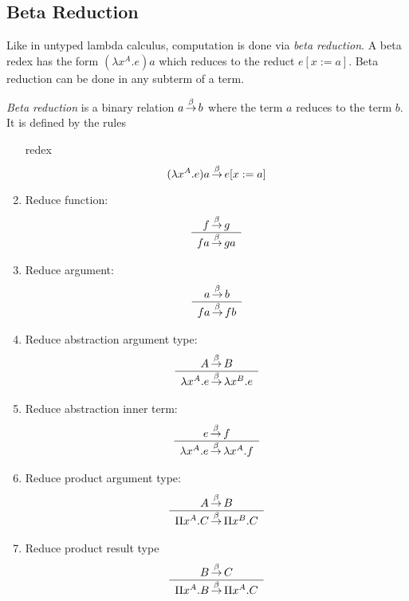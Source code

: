 \subsection{Beta Reduction}

Like in untyped lambda calculus, computation is done via \emph{beta reduction}.
A beta redex has the form $(\lambda x^A. e) a$ which reduces to the reduct
$e[x:=a]$. Beta reduction can be done in any subterm of a term.

\begin{definition}
    \emph{Beta reduction}
    is a binary relation $a {\,\stackrel{\beta}{\to}\,} b$ where the term $a$
    reduces to the term $b$. It is defined by the rules
    \begin{enumerate}

        \item[redex]
            $$
                (\lambda x^A. e) a {\,\stackrel{\beta}{\to}\,} e[x:=a]
            $$

        \item Reduce function:
            $$
                \begin{array}{c} 
                    f {\,\stackrel{\beta}{\to}\,} g
                 \\ \hline 
                    f a {\,\stackrel{\beta}{\to}\,} g a
                \end{array}
            $$

        \item Reduce argument:
            $$
                \begin{array}{c} 
                    a {\,\stackrel{\beta}{\to}\,} b
                 \\ \hline 
                    f a {\,\stackrel{\beta}{\to}\,} f b
                \end{array}
            $$

        \item Reduce abstraction argument type:
            $$
                \begin{array}{c} 
                    A {\,\stackrel{\beta}{\to}\,} B
                 \\ \hline 
                    \lambda x^A. e {\,\stackrel{\beta}{\to}\,} \lambda x^B . e
                \end{array}
            $$

        \item Reduce abstraction inner term:
            $$
                \begin{array}{c} 
                    e {\,\stackrel{\beta}{\to}\,} f
                 \\ \hline 
                    \lambda x^A. e {\,\stackrel{\beta}{\to}\,} \lambda x^A. f
                \end{array}
            $$

        \item Reduce product argument type:
            $$
                \begin{array}{c} 
                    A {\,\stackrel{\beta}{\to}\,} B
                 \\ \hline 
                    \Pi x^A. C {\,\stackrel{\beta}{\to}\,} \Pi x^B . C
                \end{array}
            $$

        \item Reduce product result type
            $$
                \begin{array}{c} 
                    B {\,\stackrel{\beta}{\to}\,} C
                 \\ \hline 
                    \Pi x^A. B {\,\stackrel{\beta}{\to}\,} \Pi x^A. C
                \end{array}
            $$
    \end{enumerate}
\end{definition}



